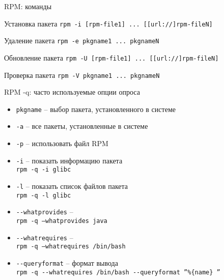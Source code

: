 \begin{frame}{RPM: команды}
	\begin{block}{Установка пакета}
		{\tt rpm -i [rpm-file1] ... [[url://]rpm-fileN] }
	\end{block}
	\begin{block}{Удаление пакета}
		{\tt rpm -e pkgname1 ... pkgnameN }
	\end{block}
	\begin{block}{Обновление пакета}
		{\tt rpm -U [rpm-file1] ... [[url://]rpm-fileN] }
	\end{block}
	\begin{block}{Проверка пакета}
		{\tt rpm -V pkgname1 ... pkgnameN }
	\end{block}
\end{frame}

\begin{frame}{RPM -q: часто используемые опции опроса}

	\begin{itemize}
		\item {\tt pkgname} -- выбор пакета, установленного в системе
		\item {\tt -a} -- все пакеты, установленные в системе
		\item {\tt -p} -- использовать файл RPM
	\end{itemize}


	\begin{itemize}
		\item {\tt -i} -- показать информацию пакета\\
			{\tt rpm -q -i glibc }
		\item {\tt -l} -- показать список файлов пакета \\
			{\tt rpm -q -l glibc }
		\item {\tt -{}-whatprovides} -- \\
			{\tt rpm -q --whatprovides java}
		\item {\tt -{}-whatrequires} -- \\
			{\tt rpm -q --whatrequires /bin/bash}
		\item {\tt -{}-queryformat} -- формат вывода\\
			{\tt rpm -q -{}-whatrequires /bin/bash -{}-queryformat ''\%\{name\} ''}

	\end{itemize}

\end{frame}


